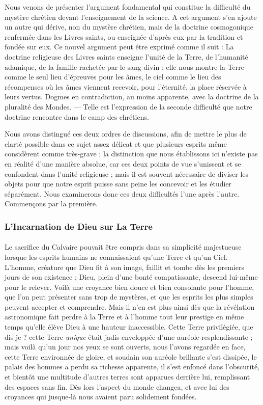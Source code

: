 \documentclass[a4paper, 11pt, oneside]{article}
\begin{document}
Nous venons de présenter l'argument fondamental qui constitue la difficulté du mystère chrétien devant l'enseignement de la science. A cet argument s'en ajoute un autre qui dérive, non du mystère chrétien, mais de la doctrine cosmogonique renfermée dans les Livres saints, ou enseignée d'après eux par la tradition et fondée sur eux. Ce nouvel argument peut être exprimé comme il suit : La doctrine religieuse des Livres saints enseigne l'unité de la Terre, de l'humanité adamique, de la famille rachetée par le sang divin ; elle nous montre la Terre comme le seul lieu d'épreuves pour les âmes, le ciel comme le lieu des récompenses où les âmes viennent recevoir, pour l'éternité, la place réservée à leurs vertus. Dogmes en contradiction, au moins apparente, avec la doctrine de la pluralité des Mondes. --- Telle est l'expression de la seconde difficulté que notre doctrine rencontre dans le camp des chrétiens.

Nous avons distingué ces deux ordres de discussions, afin de mettre le plus de clarté possible dans ce sujet assez délicat et que plusieurs esprits même considèrent comme très-grave ; la distinction que nous établissons ici n'existe pas en réalité d'une manière absolue, car ces deux points de vue s'unissent et se confondent dans l'unité religieuse ; mais il est souvent nécessaire de diviser les objets pour que notre esprit puisse sans peine les concevoir et les étudier séparément. Nous examinerons donc ces deux difficultés l'une après l'autre. Commençons par la première.

\subsubsection{L'Incarnation de Dieu sur La Terre}
\paragraph{}
Le sacrifice du Calvaire pouvait être compris dans sa simplicité majestueuse lorsque les esprits humains ne connaissaient qu'une Terre et qu'un Ciel. L'homme, créature que Dieu fit à son image, faillit et tombe dès les premiers jours de son existence ; Dieu, plein d'une bonté compatissante, descend lui-même pour le relever. Voilà une croyance bien douce et bien consolante pour l'homme, que l'on peut présenter sans trop de mystères, et que les esprits les plus simples peuvent accepter et comprendre. Mais il n'en est plus ainsi dès que la révélation astronomique fait perdre à la Terre et à l'homme tout leur prestige en même temps qu'elle élève Dieu à une hauteur inaccessible. Cette Terre privilégiée, que dis-je ? cette Terre \emph{unique} était jadis enveloppée d'une auréole resplendissante ; mais voilà qu'un jour nos yeux se sont ouverts, nous l'avons regardée en face, cette Terre environnée de gloire, et soudain son auréole brillante s'est dissipée, le palais des hommes a perdu sa richesse apparente, il s'est enfoncé dans l'obscurité, et bientôt une multitude d'autres terres sont apparues derrière lui, remplissant des espaces sans fin. Dès lors l'aspect du monde changea, et avec lui des croyances qui jusque-là nous avaient paru solidement fondées.
\end{document}
